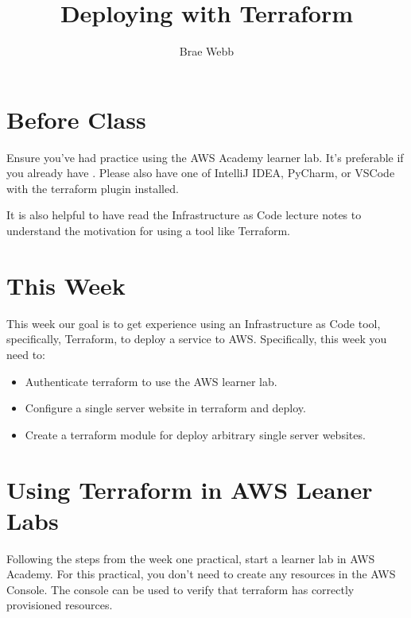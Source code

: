 \documentclass{csse4400}
\title{Deploying with Terraform}
\author{Brae Webb}
\date{\week{3}}
\begin{document}
\maketitle

\section{Before Class}
Ensure you've had practice using the AWS Academy learner lab.
It's preferable if you already have .
Please also have one of IntelliJ IDEA, PyCharm, or VSCode with the terraform plugin installed.

\noindent It is also helpful to have read the Infrastructure as Code lecture notes to understand the motivation for using a tool like Terraform.

\section{This Week}
This week our goal is to get experience using an Infrastructure as Code tool, specifically, Terraform,
to deploy a service to AWS.
Specifically, this week you need to:
\begin{itemize}
    \item Authenticate terraform to use the AWS learner lab.
    \item Configure a single server website in terraform and deploy.
    \item Create a terraform module for deploy arbitrary single server websites.
\end{itemize}

\section{Using Terraform in AWS Leaner Labs}
Following the steps from the week one practical, start a learner lab in AWS Academy.
For this practical, you don't need to create any resources in the AWS Console.
The console can be used to verify that terraform has correctly provisioned resources.
\end{document}
